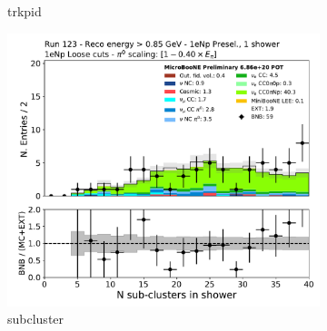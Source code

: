 \begin{figure}[H]
\begin{subfigure}{0.3\textwidth}
    \caption{trkpid}
    \end{subfigure}
    \begin{subfigure}{0.3\textwidth}
    \includegraphics[width=1.0\textwidth]{Sidebands/Figures/1eNp/HighEnergy/HiEext_NPOneShr_NPL_pi0e040/subcluster.pdf}
    \caption{subcluster}
    \end{subfigure}
    \caption{} 
    \label{fig:HE_1eNp_L_2}
\end{figure}

